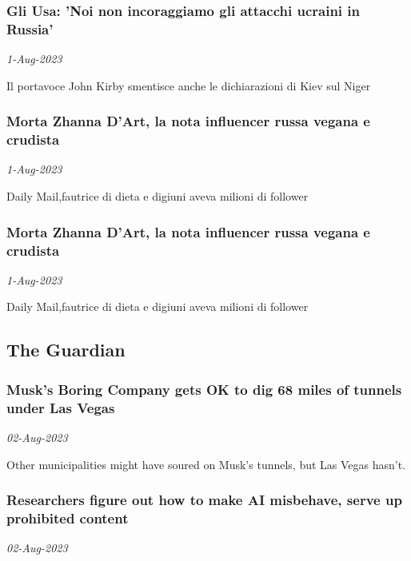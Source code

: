 \subsubsection{Gli Usa: 'Noi non incoraggiamo gli attacchi ucraini in Russia' \href{https://www.ansa.it/sito/notizie/mondo/2023/08/01/gli-usa-noi-non-incoraggiamo-gli-attacchi-ucraini-in-russia_26177111-5004-4d19-a7fa-8f41e3a59fd3.html}{}}
\textit{1-Aug-2023}

Il portavoce John Kirby smentisce anche le dichiarazioni di Kiev sul Niger
\subsubsection{Morta Zhanna D'Art, la nota influencer russa vegana e crudista \href{https://www.ansa.it/sito/notizie/mondo/asia/2023/08/01/morta-zhanna-dart-la-nota-influencer-russa-vegana-e-crudista_a21d2f7a-0f08-49b7-bece-64327e534b5b.html}{}}
\textit{1-Aug-2023}

Daily Mail,fautrice di dieta e digiuni aveva milioni di follower
\subsubsection{Morta Zhanna D'Art, la nota influencer russa vegana e crudista \href{https://www.ansa.it/sito/notizie/mondo/2023/08/01/morta-zhanna-dart-la-nota-influencer-russa-vegana-e-crudista_dcd80660-f71f-436e-9950-79452c7ef40b.html}{}}
\textit{1-Aug-2023}

Daily Mail,fautrice di dieta e digiuni aveva milioni di follower
\subsection{The Guardian \href{https://www.theguardian.com/international}{}}
\subsubsection{Musk’s Boring Company gets OK to dig 68 miles of tunnels under Las Vegas \href{https://arstechnica.com/?p=1958286}{}}
\textit{02-Aug-2023}

Other municipalities might have soured on Musk's tunnels, but Las Vegas hasn't.
\subsubsection{Researchers figure out how to make AI misbehave, serve up prohibited content \href{https://arstechnica.com/?p=1958270}{}}
\textit{02-Aug-2023}

